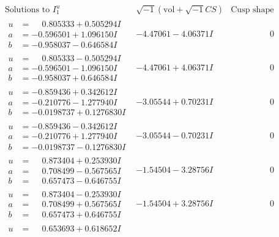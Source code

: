 \documentclass[1p]{elsarticle_modified}
\theoremstyle{definition}
\newcommand{\I}{\sqrt{-1}}
\begin{document}
$$\begin{array}{c|c|c}  
\text{Solutions to }I^u_{1}& \I (\text{vol} + \sqrt{-1}CS) & \text{Cusp shape}\\
 \hline 
\begin{aligned}
u &= \phantom{-}0.805333 + 0.505294 I \\
a &= -0.596501 + 1.096150 I \\
b &= -0.958037 - 0.646584 I\end{aligned}
 & -4.47061 - 4.06371 I & \phantom{-0.000000 } 0 \\ \hline\begin{aligned}
u &= \phantom{-}0.805333 - 0.505294 I \\
a &= -0.596501 - 1.096150 I \\
b &= -0.958037 + 0.646584 I\end{aligned}
 & -4.47061 + 4.06371 I & \phantom{-0.000000 } 0 \\ \hline\begin{aligned}
u &= -0.859436 + 0.342612 I \\
a &= -0.210776 - 1.277940 I \\
b &= -0.0198737 + 0.1276830 I\end{aligned}
 & -3.05544 + 0.70231 I & \phantom{-0.000000 } 0 \\ \hline\begin{aligned}
u &= -0.859436 - 0.342612 I \\
a &= -0.210776 + 1.277940 I \\
b &= -0.0198737 - 0.1276830 I\end{aligned}
 & -3.05544 - 0.70231 I & \phantom{-0.000000 } 0 \\ \hline\begin{aligned}
u &= \phantom{-}0.873404 + 0.253930 I \\
a &= \phantom{-}0.708499 - 0.567565 I \\
b &= \phantom{-}0.657473 - 0.646755 I\end{aligned}
 & -1.54504 - 3.28756 I & \phantom{-0.000000 } 0 \\ \hline\begin{aligned}
u &= \phantom{-}0.873404 - 0.253930 I \\
a &= \phantom{-}0.708499 + 0.567565 I \\
b &= \phantom{-}0.657473 + 0.646755 I\end{aligned}
 & -1.54504 + 3.28756 I & \phantom{-0.000000 } 0 \\ \hline\begin{aligned}
u &= \phantom{-}0.653693 + 0.618652 I \\

\end{aligned}
\end{array}$$
\end{document}
